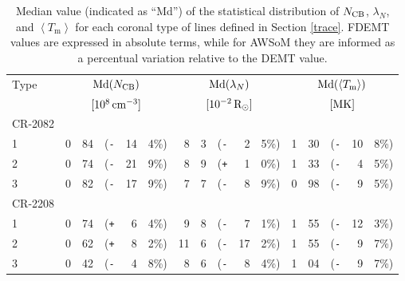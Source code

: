 \documentclass[namedreferences]{solarphysics}
\newcommand{\mrsun}{{\rm R_\odot}}
\newcommand{\med}{{\rm Md}}
\newcommand{\avgTe}{\left<T_\textrm{m}\right>}
\newcommand{\MK}{{\rm MK}}
\newcommand{\lN}{\lambda_N}
\newcommand{\NCB}{N_{\rm CB}}
\newcommand{\aTm}{\left< T_\textrm{m}\right>}
\def\Pl{\texttt{+}}
\def\Mi{\texttt{-}}
\begin{document}
\begin{article}
\begin{table}
\begin{tabular}{l r@{.}l@{\hskip 0.05in} r@{\hskip 0.01in} r@{.}l  r@{.}l@{\hskip 0.05in} r@{\hskip 0.01in} r@{.}l r@{.}l@{\hskip 0.05in} r@{\hskip 0.01in} r@{.}l }
\hline
Type    & \multicolumn{5}{c}{$\med(\NCB)$}             & \multicolumn{5}{c}{$\med(\lN)$} & \multicolumn{5}{c}{$\med(\avgTe)$} \\
       & \multicolumn{5}{c}{$[10^8\,{\rm cm}^{-3}]$}  & \multicolumn{5}{c}{$[{\rm 10}^{-2}\,\mrsun]$} & \multicolumn{5}{c}{$[\MK]$} \\
\hline
CR-2082\\
1  & 0&84 &(\Mi&14&4\%)  &   8&3 &(\Mi&~2&5\%) &   1&30 &(\Mi&10&8\%) \\
2  & 0&74 &(\Mi&21&9\%)  &   8&9 &(\Pl&~1&0\%) &   1&33 &(\Mi&~4&5\%) \\
3  & 0&82 &(\Mi&17&9\%)  &   7&7 &(\Mi&~8&9\%) &   0&98 &(\Mi&~9&5\%) \\
\hline          
CR-2208\\
1  & 0&74 &(\Pl&~6&4\%)  &   9&8 &(\Mi&~7&1\%) &   1&55 &(\Mi&12&3\%) \\
2  & 0&62 &(\Pl&~8&2\%)  &  11&6 &(\Mi&17&2\%) &   1&55 &(\Mi&~9&7\%) \\
3  & 0&42 &(\Mi&~4&8\%)  &   8&6 &(\Mi&~8&4\%) &   1&04 &(\Mi&~9&7\%) \\
\end{tabular}
\caption{Median value (indicated as ``Md'') of the statistical distribution of $\NCB$, $\lN$, and $\aTm$ for each coronal type of lines defined in Section \ref{trace}. FDEMT values are expressed in absolute terms, while for AWSoM they are informed as a percentual variation relative to the DEMT value.}
\label{tabla_comp}
\end{table}





\end{article}
\end{document}
